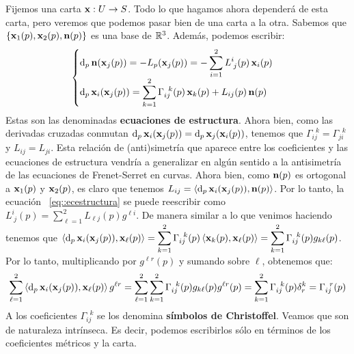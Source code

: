 Fijemos una carta $\operatorname{\mathbf{x}}:U\to S$. Todo lo que hagamos ahora dependerá de esta carta, pero veremos que podemos pasar bien de una carta a la otra. Sabemos que $\{\operatorname{\mathbf{x}}_1(p),\operatorname{\mathbf{x}}_2(p),\operatorname{\mathbf{n}}(p)\}$ es una base de $\mathbb{R}^3$. Además, podemos escribir: $$\begin{cases}\mathop{}\!\mathrm{d}_p\operatorname{\mathbf{n}}(\operatorname{\mathbf{x}}_j(p)) = -L_p(\operatorname{\mathbf{x}}_j(p)) = -\displaystyle\sum_{i=1}^2 L^i_{\;j}(p)\operatorname{\mathbf{x}}_i(p)\\ \mathop{}\!\mathrm{d}_p\operatorname{\mathbf{x}}_i(\operatorname{\mathbf{x}}_j(p)) = \displaystyle\sum_{k=1}^2 \Gamma_{ij}^{\;\;k}(p)\operatorname{\mathbf{x}}_k(p) + L_{ij}(p)\operatorname{\mathbf{n}}(p)\end{cases}$$ Estas son las denominadas \textbf{ecuaciones de estructura}. Ahora bien, como las derivadas cruzadas conmutan $\mathop{}\!\mathrm{d}_p\operatorname{\mathbf{x}}_i(\operatorname{\mathbf{x}}_j(p))=\mathop{}\!\mathrm{d}_p\operatorname{\mathbf{x}}_j(\operatorname{\mathbf{x}}_i(p))$, tenemos que $\Gamma_{ij}^{\;\;k}=\Gamma_{ji}^{\;\;k}$ y $L_{ij}=L_{ji}$. Esta relación de (anti)simetría que aparece entre los coeficientes y las ecuaciones de estructura vendría a generalizar en algún sentido a la antisimetría de las ecuaciones de Frenet-Serret en curvas. Ahora bien, como $\operatorname{\mathbf{n}}(p)$ es ortogonal a $\operatorname{\mathbf{x}}_1(p)$ y $\operatorname{\mathbf{x}}_2(p)$, es claro que tenemos $L_{ij}=\left\langle \mathop{}\!\mathrm{d}_p\operatorname{\mathbf{x}}_i(\operatorname{\mathbf{x}}_j(p)),\operatorname{\mathbf{n}}(p) \right\rangle$. Por lo tanto, la ecuación ~\ref{eq::ecestructura} se puede reescribir como $L^i_{\; j}(p)=\displaystyle\sum_{\ell=1}^2 L_{\ell j}(p)g^{\ell i}$. De manera similar a lo que venimos haciendo tenemos que $\left\langle \mathop{}\!\mathrm{d}_p\operatorname{\mathbf{x}}_i(\operatorname{\mathbf{x}}_j(p)),\operatorname{\mathbf{x}}_\ell(p) \right\rangle = \displaystyle\sum_{k=1}^2 \Gamma_{ij}^{\;\;k}(p)\left\langle \operatorname{\mathbf{x}}_k(p),\operatorname{\mathbf{x}}_\ell(p) \right\rangle=\displaystyle\sum_{k=1}^2\Gamma_{ij}^{\;\;k}(p)g_{k\ell}(p)$. Por lo tanto, multiplicando por $g^{\ell r}(p)$ y sumando sobre $\ell$, obtenemos que: $$\displaystyle\sum_{\ell=1}^2 \left\langle \mathop{}\!\mathrm{d}_p\operatorname{\mathbf{x}}_i(\operatorname{\mathbf{x}}_j(p)),\operatorname{\mathbf{x}}_\ell(p) \right\rangle g^{\ell r} = \sum_{\ell=1}^2 \sum_{k=1}^2 \Gamma_{ij}^{\;\; k}(p)g_{k\ell}(p)g^{\ell r}(p) = \sum_{k=1}^2 \Gamma_{ij}^{\;\; k}(p)\delta_{r}^k = \Gamma_{ij}^{\;\;r}(p)$$ A los coeficientes $\Gamma_{ij}^{\;\;k}$ se los denomina \textbf{símbolos de Christoffel}. Veamos que son de naturaleza intrínseca. Es decir, podemos escribirlos sólo en términos de los coeficientes métricos y la carta.

